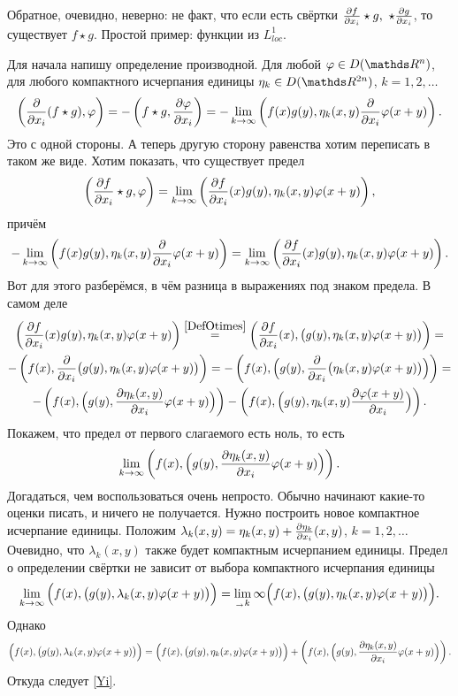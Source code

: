 Обратное, очевидно, неверно: не факт, что если есть свёртки  $\frac{\partial f}{\partial x_i}\star g,\ \star\frac{\partial g}{\partial x_i}$, то существует $f\star g$. Простой пример: функции из $L^1_{loc}$.
\begin{Proof}
  Для начала напишу определение производной. Для любой $\phi\in D(\R^n)$, для любого компактного исчерпания единицы $\eta_k\in D(\R^{2n})$, $k=1,2,\dots$
  \[
     \left(\frac{\partial }{\partial x_i}(f\star g),\varphi\right) = - \left(f\star g,\frac{\partial \varphi}{\partial x_i}\right) =
    -\lim\limits_{k\rightarrow\infty}\left(f(x)g(y),\eta_k(x,y)\frac{\partial }{\partial x_i}\varphi(x+y)\right).
  \]
  Это с одной стороны. А теперь другую сторону равенства хотим переписать в таком же виде. Хотим показать, что существует предел
  \[
    \left(\frac{\partial f}{\partial x_i}\star g,\varphi\right) = \lim\limits_{k\rightarrow\infty} \left( \frac{\partial f}{\partial x_i}(x)g(y),\eta_k(x,y)\varphi(x+y)\right),
  \]
  причём
  \[
    -\lim\limits_{k\rightarrow\infty}\left(f(x)g(y),\eta_k(x,y)\frac{\partial }{\partial x_i}\varphi(x+y)\right) = \lim\limits_{k\rightarrow\infty} \left( \frac{\partial f}{\partial x_i}(x)g(y),\eta_k(x,y)\varphi(x+y)\right).
  \]
  Вот для этого разберёмся, в чём разница в выражениях под знаком предела. В самом деле
  \begin{multline*}
    \left(\CP f{x_i}(x)g(y),\eta_k(x,y)\phi(x+y)\right) \overset{\ref{DefOtimes}} = 
    \left(\CP f{x_i}(x),\big(g(y),\eta_k(x,y)\phi(x+y)\big)\right)=\\
   -\left(f(x),\CP{}{x_i}\big(g(y),\eta_k(x,y)\phi(x+y)\big)\right)=
   -\left(f(x),\Big(g(y),\CP{}{x_i}\big(\eta_k(x,y)\phi(x+y)\big)\Big)\right)=\\
   -\left(f(x),\Big(g(y),\CP{\eta_k(x,y)}{x_i}\phi(x+y)\Big)\right)
   -\left(f(x),\Big(g(y),\eta_k(x,y)\CP{\phi(x+y)}{x_i}\Big)\right). %
  \end{multline*}
  Покажем, что предел от первого слагаемого есть ноль, то есть
  \begin{equation} \label{Yi}
    \lim\limits_{k\rightarrow\infty}\left(f(x),\Big(g(y),\frac{\partial \eta_k(x,y)}{\partial x_i}\varphi(x+y)\Big)\right).
  \end{equation}
  Догадаться, чем воспользоваться очень непросто. Обычно начинают какие-то оценки писать, и ничего не получается. Нужно построить новое компактное исчерпание единицы. Положим $\lambda_k(x,y) = \eta_k(x,y) + \frac{\partial \eta_k}{\partial x_i}(x,y)$, $k=1,2,\dots$ Очевидно, что $\lambda_k(x,y)$ также будет компактным исчерпанием единицы. Предел о определении свёртки не зависит от выбора компактного исчерпания единицы
  \[
    \lim\limits_{k\rightarrow\infty}\Big(f(x),\big(g(y),\lambda_k(x,y)\varphi(x+y)\big)\Big) = \lim\limits_{_\rightarrow k}\infty\Big(f(x),\big(g(y),\eta_k(x,y)\varphi(x+y)\big)\Big).
  \]
  Однако
  \[
    \Big(f(x),\big(g(y),\lambda_k(x,y)\varphi(x+y)\big)\Big) = \Big(f(x),\big(g(y),\eta_k(x,y)\varphi(x+y)\big)\Big) +\left(f(x),\Big(g(y),\frac{\partial \eta_k(x,y)}{\partial x_i}\varphi(x+y)\Big)\right).
  \]
  Откуда следует \eqref{Yi}.


\end{Proof}
